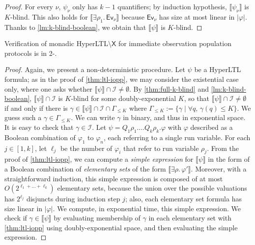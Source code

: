 \documentclass[10pt,a4paper]{article}
\renewcommand{\leq}{\leqslant}
\newcommand{\set}[1]{\{#1\}}
\newcommand{\nset}[2]{[#1,#2]}
\newcommand{\deff}{:=}
\newcommand{\size}[1]{|#1|}
\newcommand{\config}{\gamma}
\newcommand{\configs}{\Gamma}
\newcommand{\initialconfigs}{\mathcal{I}}
\newcommand{\run}{\rho}
\newcommand{\aquantif}{Q}
\newcommand{\satset}[1]{\llbracket {#1} \rrbracket}
\newcommand{\initial}{\mathcal{I}}   %
\newcommand{\ltlnext}{\mathsf{X}}
\begin{document}
\begin{proof}
	For every \(\nu\), \(\psi_\nu\) only has \(k-1\) quantifiers; by induction hypothesis, \(\satset{\psi_\nu}\) is \(K\)-blind.
	This also holds for \(\satset{\exists \run_1.
		\, \mathsf{Ev}_{\nu}}\) because \(\mathsf{Ev}_{\nu}\) has size at most linear in \( \size{\varphi}\).
	Thanks to \cref{lm:k-blind-boolean}, we obtain that \(\satset{\psi}\) is \(K\)-blind.


\end{proof}

%

\begin{theorem}
	\label{thm:hyperltl-iopp}
	Verification of monadic HyperLTL\(\setminus \ltlnext\) for immediate observation population protocols is in 2-\EXPSPACE.
\end{theorem}
\begin{proof}
	Again, we present a non-deterministic procedure.
	Let \(\psi\) be a HyperLTL formula; as in the proof of \cref{thm:ltl-iopp}, we may consider the existential case only, where one asks whether \(\satset{\psi} \cap \initialconfigs \ne \emptyset\).
	By \cref{thm:full-k-blind} and \cref{lm:k-blind-boolean}, \(\satset{\psi} \cap \initialconfigs\) is \(K\)-blind for some doubly-exponential \(K\), so that \(\satset{\psi} \cap \initialconfigs \ne \emptyset\) if and only if there is \(\config \in \satset{\psi} \cap \initialconfigs \cap \configs_{\leq K}\) where \(\configs_{\leq K} \deff \set{\config \mid \forall q, \, \config(q) \leq K}\).
	We guess such a \(\config \in \configs_{\leq K}\).
	We can write \(\config\) in binary, and thus in exponential space.
	It is easy to check that \(\config \in \initial\).
	Let \(\psi = \aquantif_1 \run_1.
	\ldots \aquantif_k \run_k. \varphi\) with \(\varphi\)  described as a Boolean combination of \(\varphi_1\) to \(\varphi_n\), each referring to a single run variable.
	For each \(j \in \nset{1}{k}\), let \(\ell_j\) be the number of \(\varphi_i\) that refer to run variable \(\run_j\).
	From the proof of \cref{thm:ltl-iopp}, we can compute a \emph{simple expression} for \(\satset{\psi}\) in the form of a Boolean combination of \emph{elementary sets} of the form \(\satset{\exists \run.
		\, \varphi'}\).
	Moreover, with a straightforward induction, this simple expression is composed of at most \(O(2^{\ell_1 + \dots + \ell_k})\) elementary sets, because the union over the possible valuations has \(2^{\ell_j}\) disjuncts during induction step \(j\); also, each elementary set formula has size linear in \( \size{\varphi}\).
	We compute, in exponential time, this simple expression.
	We check if \(\config \in \satset{\psi}\) by evaluating membership of \(\config\) in each elementary set with \cref{thm:ltl-iopp} using doubly-exponential space, and then evaluating the simple expression.

\end{proof}
\end{document}
